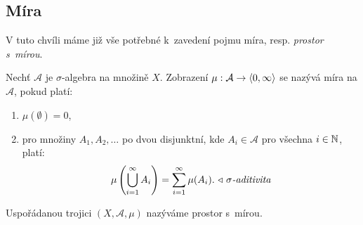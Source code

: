 \subsection{Míra}\label{subsec:mira}

V tuto chvíli máme již vše potřebné k~zavedení pojmu míra, resp. \emph{prostor s~mírou}.
\begin{definition}\label{def:prostor-s-mirou}
    Nechť $\mathcal{A}$ je $\sigma$-algebra na množině $X$. Zobrazení $\mu:\mathcal{A} \rightarrow \langle0,\infty\rangle$ se nazývá míra na $\mathcal{A}$, pokud platí:
    \begin{enumerate}[label=(\roman*)]
        \item $\mu(\emptyset)=0$,
        \item pro množiny $A_1,A_2,\dots$ po dvou disjunktní, kde $A_i\in\mathcal{A}$ pro všechna $i\in\mathbb{N}$, platí:
        \[\mu\left(\bigcup\limits_{i=1}^\infty A_i\right)=\sum_{i=1}^\infty\mu(A_i).\text{\rightnote{$\sigma$-aditivita}}\]
    \end{enumerate}
    Uspořádanou trojici $(X,\mathcal{A},\mu)$ nazýváme prostor s~mírou.
\end{definition}